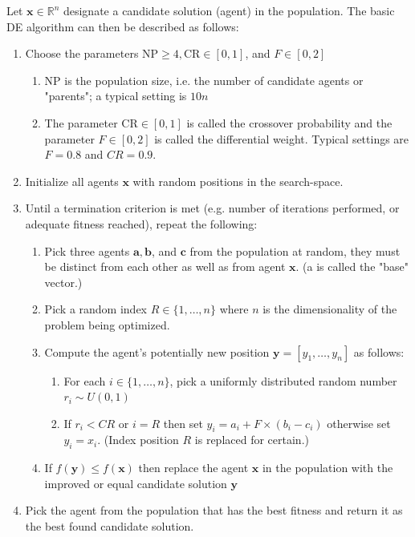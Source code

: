 Let $\mathbf{x} \in \mathbb{R}^n$ designate a candidate solution (agent) in the population. The basic DE algorithm can then be described as follows:
\begin{enumerate}
\item Choose the parameters $\mathrm{NP} \geq 4, \mathrm{CR} \in[0,1]$, and $F \in[0,2]$
    \begin{enumerate}
        \item $\mathrm{NP}$ is the population size, i.e. the number of candidate agents or "parents"; a typical setting is $10 n$
        \item The parameter $\mathrm{CR} \in[0,1]$ is called the crossover probability and the parameter $F \in[0,2]$ is called the differential weight. Typical settings are $F=0.8$ and $C R=0.9$.
    \end{enumerate}
    \item Initialize all agents $\mathbf{x}$ with random positions in the search-space.
    \item Until a termination criterion is met (e.g. number of iterations performed, or adequate fitness reached), repeat the following:
    \begin{enumerate}
        \item Pick three agents $\mathbf{a}, \mathbf{b}$, and $\mathbf{c}$ from the population at random, they must be distinct from each other as well as from agent $\mathbf{x}$. (a is called the "base" vector.)
        \item Pick a random index $R \in\{1, \ldots, n\}$ where $n$ is the dimensionality of the problem being optimized.
        \item Compute the agent's potentially new position $\mathbf{y}=\left[y_1, \ldots, y_n\right]$ as follows:
        \begin{enumerate}
        \item For each $i \in\{1, \ldots, n\}$, pick a uniformly distributed random number $r_i \sim U(0,1)$
        \item If $r_i<C R$ or $i=R$ then set $y_i=a_i+F \times\left(b_i-c_i\right)$ otherwise set $y_i=x_i$. (Index position $R$ is replaced for certain.)
        \end{enumerate}
        \item If $f(\mathbf{y}) \leq f(\mathbf{x})$ then replace the agent $\mathbf{x}$ in the population with the improved or equal candidate solution $\mathbf{y}$
    \end{enumerate}
    \item Pick the agent from the population that has the best fitness and return it as the best found candidate solution.
\end{enumerate} 


